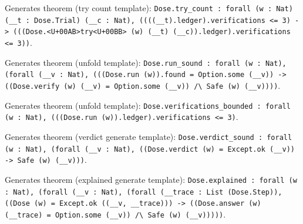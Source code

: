 \documentclass[11pt]{article}
\begin{document}
\noindent Generates theorem (try count template): \texttt{Dose.try\_count : forall (w : Nat) (\_\_t : Dose.Trial) (\_\_c : Nat), ((((\_\_t).ledger).verifications <= 3) -> (((Dose.<U+00AB>try<U+00BB> (w) (\_\_t) (\_\_c)).ledger).verifications <= 3))}.\par
\noindent Generates theorem (unfold template): \texttt{Dose.run\_sound : forall (w : Nat), (forall (\_\_v : Nat), (((Dose.run (w)).found = Option.some (\_\_v)) -> ((Dose.verify (w) (\_\_v) = Option.some (\_\_v)) /\textbackslash{} Safe (w) (\_\_v))))}.\par
\noindent Generates theorem (unfold template): \texttt{Dose.verifications\_bounded : forall (w : Nat), (((Dose.run (w)).ledger).verifications <= 3)}.\par
\noindent Generates theorem (verdict generate template): \texttt{Dose.verdict\_sound : forall (w : Nat), (forall (\_\_v : Nat), ((Dose.verdict (w) = Except.ok (\_\_v)) -> Safe (w) (\_\_v)))}.\par
\noindent Generates theorem (explained generate template): \texttt{Dose.explained : forall (w : Nat), (forall (\_\_v : Nat), (forall (\_\_trace : List (Dose.Step)), ((Dose (w) = Except.ok ((\_\_v, \_\_trace))) -> ((Dose.answer (w) (\_\_trace) = Option.some (\_\_v)) /\textbackslash{} Safe (w) (\_\_v)))))}.\par
\end{document}
